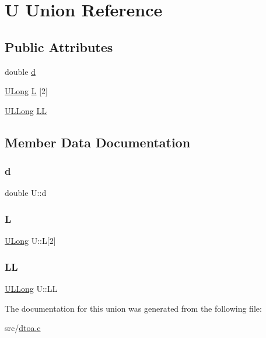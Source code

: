 \hypertarget{union_u}{}\section{U Union Reference}
\label{union_u}
\subsection*{Public Attributes}
\begin{DoxyCompactItemize}
\item 
double \hyperlink{union_u_a6379e5194213c802bb8c6786eca8ad50}{d}
\item 
\hyperlink{dtoa_8c_afa5f820499f9d3fb566021c346784449}{U\+Long} \hyperlink{union_u_aa72022b00fe1608edcdbc0a12e525164}{L} \mbox{[}2\mbox{]}
\item 
\hyperlink{dtoa_8c_a0378f05bb0539a1ed6149576a0919413}{U\+L\+Long} \hyperlink{union_u_a3f8955c21f368b696f30180bccc2537e}{LL}
\end{DoxyCompactItemize}


\subsection{Member Data Documentation}
\mbox{\label{union_u_a6379e5194213c802bb8c6786eca8ad50}} 
\subsubsection{\texorpdfstring{d}{d}}
{\footnotesize\ttfamily double U\+::d}

\mbox{\label{union_u_aa72022b00fe1608edcdbc0a12e525164}} 
\subsubsection{\texorpdfstring{L}{L}}
{\footnotesize\ttfamily \hyperlink{dtoa_8c_afa5f820499f9d3fb566021c346784449}{U\+Long} U\+::L\mbox{[}2\mbox{]}}

\mbox{\label{union_u_a3f8955c21f368b696f30180bccc2537e}} 
\subsubsection{\texorpdfstring{LL}{LL}}
{\footnotesize\ttfamily \hyperlink{dtoa_8c_a0378f05bb0539a1ed6149576a0919413}{U\+L\+Long} U\+::\+LL}



The documentation for this union was generated from the following file\+:\begin{DoxyCompactItemize}
\item 
src/\hyperlink{dtoa_8c}{dtoa.\+c}\end{DoxyCompactItemize}
